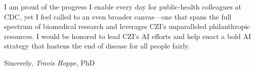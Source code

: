\documentclass[]{scrartcl}
\begin{document}
\begin{cleanCV}
I am proud of the progress I enable every day for public‑health colleagues at CDC, yet I feel called to an even broader canvas—one that spans the full spectrum of biomedical research and leverages CZI’s unparalleled philanthropic resources. I would be honored to lead CZI’s AI efforts and help enact a bold AI strategy that hastens the end of disease for all people fairly.

  Sincerely,\newline
  \emph{Travis Hoppe}, PhD
  
\end{cleanCV}
\end{document}
